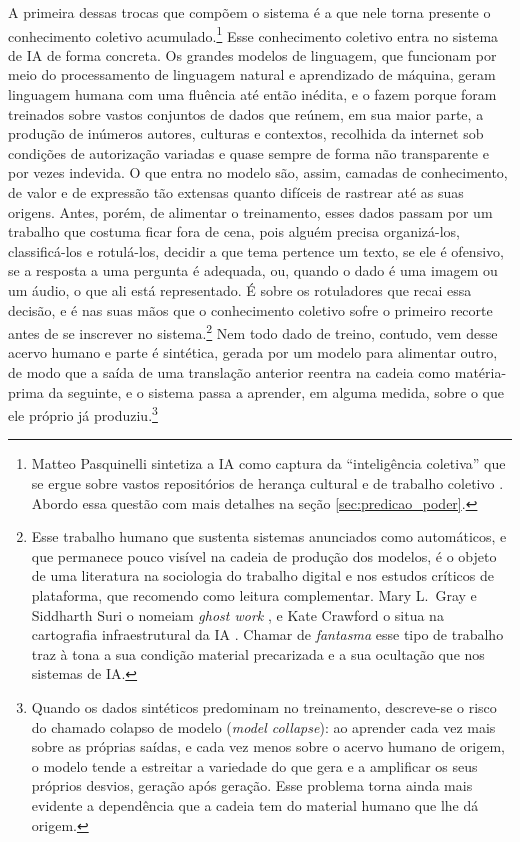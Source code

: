 A primeira dessas trocas que compõem o sistema é a que nele torna presente o conhecimento coletivo acumulado.\footnote{Matteo Pasquinelli sintetiza a IA como captura da \enquote{inteligência coletiva} que se ergue sobre vastos repositórios de herança cultural e de trabalho coletivo \parencite {Pasquinelli_EyeMaster_2023}. Abordo essa questão com mais detalhes na seção \ref{sec:predicao_poder}.} Esse conhecimento coletivo entra no sistema de IA de forma concreta. Os grandes modelos de linguagem, que funcionam por meio do processamento de linguagem natural e aprendizado de máquina, geram linguagem humana com uma fluência até então inédita, e o fazem porque foram treinados sobre vastos conjuntos de dados que reúnem, em sua maior parte, a produção de inúmeros autores, culturas e contextos, recolhida da internet sob condições de autorização variadas e quase sempre de forma não transparente e por vezes indevida. O que entra no modelo são, assim, camadas de conhecimento, de valor e de expressão tão extensas quanto difíceis de rastrear até as suas origens. Antes, porém, de alimentar o treinamento, esses dados passam por um trabalho que costuma ficar fora de cena, pois alguém precisa organizá-los, classificá-los e rotulá-los, decidir a que tema pertence um texto, se ele é ofensivo, se a resposta a uma pergunta é adequada, ou, quando o dado é uma imagem ou um áudio, o que ali está representado. É sobre os rotuladores que recai essa decisão, e é nas suas mãos que o conhecimento coletivo sofre o primeiro recorte antes de se inscrever no sistema.\footnote{Esse trabalho humano que sustenta sistemas anunciados como automáticos, e que permanece pouco visível na cadeia de produção dos modelos, é o objeto de uma literatura na sociologia do trabalho digital e nos estudos críticos de plataforma, que recomendo como leitura complementar. Mary L.~Gray e Siddharth Suri o nomeiam \emph{ghost work} \parencite{Gray2019GhostWork}, e Kate Crawford o situa na cartografia infraestrutural da IA \parencite{Crawford2021Atlas}. Chamar de \emph{fantasma} esse tipo de trabalho traz à tona a sua condição material precarizada e a sua ocultação que nos sistemas de IA.} Nem todo dado de treino, contudo, vem desse acervo humano e parte é sintética, gerada por um modelo para alimentar outro, de modo que a saída de uma translação anterior reentra na cadeia como matéria-prima da seguinte, e o sistema passa a aprender, em alguma medida, sobre o que ele próprio já produziu.\footnote{Quando os dados sintéticos predominam no treinamento, descreve-se o risco do chamado colapso de modelo (\emph{model collapse}): ao aprender cada vez mais sobre as próprias saídas, e cada vez menos sobre o acervo humano de origem, o modelo tende a estreitar a variedade do que gera e a amplificar os seus próprios desvios, geração após geração. Esse problema torna ainda mais evidente a dependência que a cadeia tem do material humano que lhe dá origem.}

